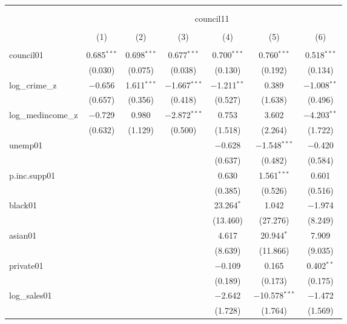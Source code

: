 
\begin{table}[!htbp] \centering 
  \caption{} 
  \label{} 
\begin{tabular}{@{\extracolsep{5pt}}lcccccc} 
\\[-1.8ex]\hline \\[-1.8ex] 
\\[-1.8ex] & \multicolumn{6}{c}{council11} \\ 
\\[-1.8ex] & (1) & (2) & (3) & (4) & (5) & (6)\\ 
\hline \\[-1.8ex] 
 council01 & 0.685$^{***}$ & 0.698$^{***}$ & 0.677$^{***}$ & 0.700$^{***}$ & 0.760$^{***}$ & 0.518$^{***}$ \\ 
  & (0.030) & (0.075) & (0.038) & (0.130) & (0.192) & (0.134) \\ 
  log\_crime\_z & $-$0.656 & 1.611$^{***}$ & $-$1.667$^{***}$ & $-$1.211$^{**}$ & 0.389 & $-$1.008$^{**}$ \\ 
  & (0.657) & (0.356) & (0.418) & (0.527) & (1.638) & (0.496) \\ 
  log\_medincome\_z & $-$0.729 & 0.980 & $-$2.872$^{***}$ & 0.753 & 3.602 & $-$4.203$^{**}$ \\ 
  & (0.632) & (1.129) & (0.500) & (1.518) & (2.264) & (1.722) \\ 
  unemp01 &  &  &  & $-$0.628 & $-$1.548$^{***}$ & $-$0.420 \\ 
  &  &  &  & (0.637) & (0.482) & (0.584) \\ 
  p.inc.supp01 &  &  &  & 0.630 & 1.561$^{***}$ & 0.601 \\ 
  &  &  &  & (0.385) & (0.526) & (0.516) \\ 
  black01 &  &  &  & 23.264$^{*}$ & 1.042 & $-$1.974 \\ 
  &  &  &  & (13.460) & (27.276) & (8.249) \\ 
  asian01 &  &  &  & 4.617 & 20.944$^{*}$ & 7.909 \\ 
  &  &  &  & (8.639) & (11.866) & (9.035) \\ 
  private01 &  &  &  & $-$0.109 & 0.165 & 0.402$^{**}$ \\ 
  &  &  &  & (0.189) & (0.173) & (0.175) \\ 
  log\_sales01 &  &  &  & $-$2.642 & $-$10.578$^{***}$ & $-$1.472 \\ 
  &  &  &  & (1.728) & (1.764) & (1.569) \\ 

\end{tabular}
\end{table}
